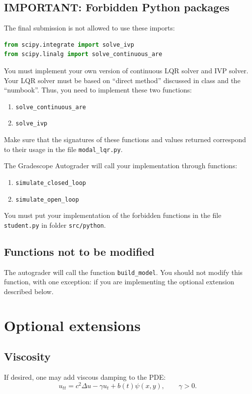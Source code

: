 \documentclass[11pt]{article}
\begin{document}
\subsection{IMPORTANT: Forbidden Python packages} 
The final submission is not allowed to use these imports:
\begin{lstlisting}[language=Python]
from scipy.integrate import solve_ivp
from scipy.linalg import solve_continuous_are
\end{lstlisting}

You must implement your own version of continuous LQR solver and
IVP solver. Your LQR solver must be based on ``direct method''
discussed in class and the ``numbook''. Thus, you need to implement these
two functions:

\begin{enumerate}
\item \texttt{solve\_continuous\_are}
\item \texttt{solve\_ivp}
\end{enumerate}

Make sure that the signatures of these functions and values returned
correspond to their usage in the file \texttt{modal\_lqr.py}.

The Gradescope Autograder will call your implementation
through functions:

\begin{enumerate}
  \item \texttt{simulate\_closed\_loop}
  \item \texttt{simulate\_open\_loop}
\end{enumerate}

You must put your implementation of the forbidden functions in the file
\texttt{student.py} in folder \texttt{src/python}.

\subsection{Functions not to be modified}
The autograder will call the function \texttt{build\_model}.
You should not modify this function, with one exception: if
you are implementing the optional extension described below.


\section*{Optional extensions}
\subsection{Viscosity}
If desired, one may add viscous damping to the PDE:
\[u_{tt}=c^2\Delta u - \gamma u_t + b(t)\psi(x,y),\qquad \gamma>0.\]
\end{document}
